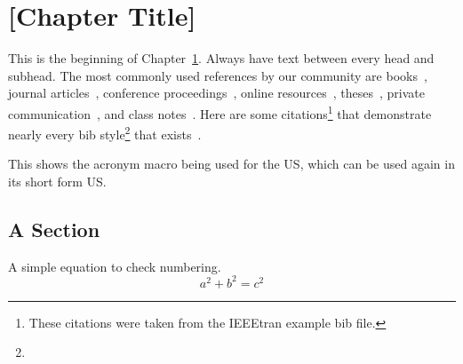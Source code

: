 \chapter{[Chapter Title]}\label{ch:common}

This is the beginning of Chapter~\ref{ch:common}. Always have text between every head
and subhead. The most commonly used references by our community are
   books~\cite{IEEEexample:book_typical},
   journal articles~\cite{IEEEexample:article_typical},
   conference proceedings~\cite{IEEEexample:conf_typical},
   online resources~\cite{IEEEhowto:IEEEtranpage},
   theses~\cite{IEEEexample:masters},
   private communication~\cite{IEEEexample:private}, and
   class notes~\cite{NPSexample:notes}.
Here are some citations\footnote{These citations were taken
from the IEEEtran example bib file.} that demonstrate nearly every bib 
style\footnote{\lipsum[10]} that exists~\cite{IEEEhowto:IEEEtranpage,
IEEEexample:shellCTANpage,IEEEexample:bibtexuser,IEEEexample:bibtexdesign,
IEEEexample:tamethebeast,IEEEexample:bibtexguide,
IEEEexample:article_typical,IEEEexample:articleetal,IEEEexample:conf_typical,
IEEEexample:book_typical,IEEEexample:articlelargepages,
IEEEexample:articledualmonths,IEEEexample:TBParticle,
IEEEexample:bookwitheditor,IEEEexample:book,IEEEexample:bookwithseriesvolume,
IEEEexample:inbook,IEEEexample:inbookpagesnote,IEEEexample:incollection,
IEEEexample:incollectionwithseries,IEEEexample:incollection_chpp,
IEEEexample:incollectionmanyauthors,
IEEEexample:motmanualhowpub,IEEEexample:confwithadddays,
IEEEexample:confwithvolume,IEEEexample:confwithpaper,
IEEEexample:confwithpapertype,IEEEexample:presentedatconf,
IEEEexample:masters,IEEEexample:masterstype,IEEEexample:phdurl,
IEEEexample:techrep,IEEEexample:techreptype,IEEEexample:techreptypeii,
IEEEexample:techrepstdsub,IEEEexample:unpublished,IEEEexample:electronhowinfo,
IEEEexample:electronhowinfo2,IEEEexample:electronorgadd,IEEEexample:uspat,
IEEEexample:jppat,IEEEexample:frenchpatreq,
IEEEexample:standard,IEEEexample:standardproposed,IEEEexample:draftasmisc,
IEEEexample:miscforum,IEEEexample:whitepaper,IEEEexample:datasheet,
IEEEexample:private,IEEEexample:miscrfc,IEEEexample:softmanual,
IEEEexample:softonline,IEEEexample:miscgermanreg,IEEEexample:bluebookstandard
}.

This shows the acronym macro being used for the \ac{US}, which can
be used again in its short form \ac{US}.

\section{A Section}\label{sec:something}
A simple equation to check numbering.
\begin{equation}
a^2 + b^2 = c^2
\end{equation}
\lipsum[1-4] %

